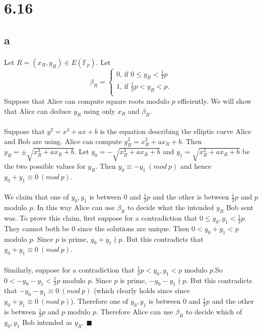 \documentclass[letterpaper,12pt,oneside,onecolumn]{report}
\begin{document}
\section*{6.16}
\subsection*{a}
\paragraph{}
Let $R = (x_R, y_R) \in E(\mathbb{F}_p)$. Let
\begin{equation*}
\beta_R = \begin{cases}
0 \text{, if $0 \leq y_R < \frac{1}{2}p$}\\
1 \text{, if $\frac{1}{2}p < y_R < p$.}\\
\end{cases}
\end{equation*}
Suppose that Alice can compute square roots modulo $p$ efficiently. We will show that Alice can deduce $y_R$ using only $x_R$ and $\beta_R$. 
\paragraph{}
Suppose that $y^2 = x^3 + ax + b$ is the equation describing the elliptic curve Alice and Bob are using. Alice can compute $y_R^2 = x_R^3 + ax_R + b$. Then $y_R = \pm \sqrt{x_R^3 + ax_R + b}$. Let $y_0 = -\sqrt{x_R^3 + ax_R + b}$ and $y_1 = \sqrt{x_R^3 + ax_R + b}$ be the two possible values for $y_R$. Then $y_0 \equiv -y_1\ (mod\ p)$ and hence $y_0 + y_1 \equiv 0\ (mod\ p)$.
\paragraph{}
We claim that one of $y_0,y_1$ is between $0$ and $\frac{1}{2}p$ and the other is between $\frac{1}{2}p$ and $p$ modulo $p$. In this way Alice can use $\beta_R$ to decide what the intended $y_R$ Bob sent was. To prove this claim, first suppose for a contradiction that $0 \leq y_0,y_1 < \frac{1}{2}p$. They cannot both be $0$ since the solutions are unique. Then $0 < y_0 + y_1 < p$ modulo $p$. Since $p$ is prime, $y_0 + y_1 \nmid p$. But this contradicts that $y_0 + y_1 \equiv 0\ (mod\ p)$.
\paragraph{}
Similarly, suppose for a contradiction that $\frac{1}{2}p < y_0,y_1 < p$ modulo $p$.So  $0 < -y_0 -y_1 < \frac{1}{2}p$ modulo $p$. Since $p$ is prime, $-y_0 - y_1 \nmid p$. But this contradicts that $-y_0 -y_1 \equiv 0\ (mod\ p)$ (which clearly holds since since $y_0 + y_1 \equiv 0\ (mod\ p)$). Therefore one of $y_0,y_1$ is between $0$ and $\frac{1}{2}p$ and the other is between $\frac{1}{2}p$ and $p$ modulo $p$. Therefore Alice can use $\beta_R$ to decide which of $y_0,y_1$ Bob intended as $y_R$. $\blacksquare$
\end{document}
